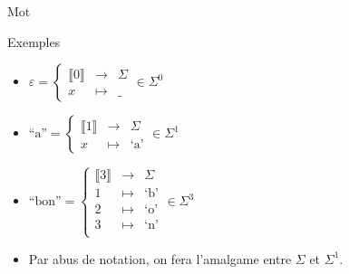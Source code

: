 \begin{frame}{Mot}
\begin{exampleblock}{Exemples}
    \begin{minipage}[t]{.5\textwidth}
      \begin{itemize}
      \item $\varepsilon = \left\{\begin{array}{ccc}
        \llbracket 0\rrbracket & \rightarrow & \Sigma\\
        x & \mapsto & \_
      \end{array}\right. \in \Sigma^0$
      \item $\text{``a''} = \left\{\begin{array}{ccc}
        \llbracket 1\rrbracket & \rightarrow & \Sigma\\
        x & \mapsto & \text{`a'}
      \end{array}\right. \in \Sigma^1$
      \end{itemize}
    \end{minipage}%
    \begin{minipage}[t]{.5\textwidth}
      \begin{itemize}
      \item $\text{``bon''} = \left\{\begin{array}{ccc}
        \llbracket 3\rrbracket& \rightarrow & \Sigma\\
        1 & \mapsto & \text{`b'}\\
        2 & \mapsto & \text{`o'}\\
        3 & \mapsto & \text{`n'}\\
      \end{array}\right. \in \Sigma^3$
      \end{itemize}
    \end{minipage}%
    \begin{itemize}
    \item Par abus de notation, on fera l'amalgame entre $\Sigma$ et $\Sigma^1$. 
    \end{itemize}
  \end{exampleblock}

\end{frame}

\endgroup
